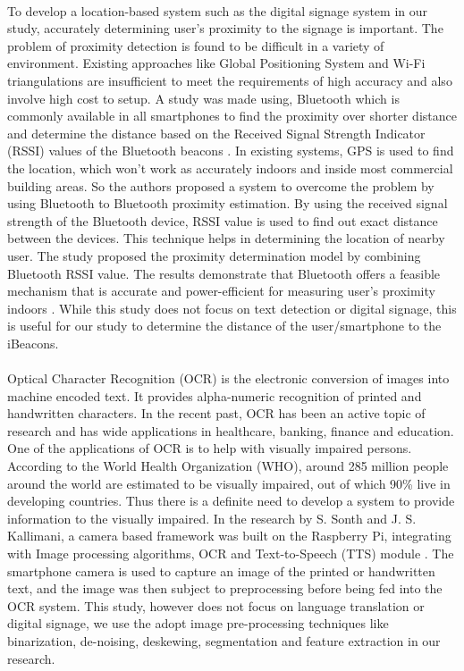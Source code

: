 \documentclass[12pt]{article}
\begin{document}
\paragraph{} To develop a location-based system such as the digital signage system in our study, accurately determining user's proximity to the signage is important. The problem of proximity detection is found to be difficult in a variety of environment. Existing approaches like Global Positioning System and Wi-Fi triangulations are insufficient to meet the requirements of high accuracy and also involve high cost to setup. A study was made using, Bluetooth which is commonly available in all smartphones to find the proximity over shorter distance and determine the distance based on the Received Signal Strength Indicator (RSSI) values of the Bluetooth  beacons \cite{distance}. In existing systems, GPS is used to find the location, which won't work as accurately indoors and inside most commercial building areas. So the authors proposed a system to overcome the problem by using Bluetooth to Bluetooth proximity estimation. By using the received signal strength of the Bluetooth device, RSSI value is used to find out exact distance between the devices. This technique helps in determining the location of nearby user. The study proposed the proximity determination model by combining Bluetooth RSSI value. The results demonstrate that Bluetooth offers a feasible mechanism that is accurate and power-efficient for measuring user's proximity indoors \cite{distance}. While this study does not focus on text detection or digital signage, this is  useful for our study to determine the distance of the user/smartphone to the iBeacons.

\paragraph{}Optical Character Recognition (OCR) is the electronic conversion of images into machine encoded text. It provides alpha-numeric recognition of printed and handwritten characters. In the recent past, OCR has been an active topic of research and has wide applications in healthcare, banking, finance and education. One of the applications of OCR is to help with visually impaired persons. According to the World Health Organization (WHO), around 285 million people around the world are estimated to be visually impaired, out of which 90\% live in developing countries. Thus there is a definite need to develop a system to provide information to the visually impaired. In the research by S. Sonth and J. S. Kallimani, a camera based framework was built on the Raspberry Pi, integrating with Image processing algorithms, OCR and Text-to-Speech (TTS) module \cite{ocr}. The smartphone camera is used to capture an image of the printed or handwritten text, and the image was then subject to preprocessing before being fed into the OCR system.\cite{ocr} This study, however does not focus on language translation or digital signage, we use the adopt image pre-processing techniques like binarization, de-noising, deskewing, segmentation and feature extraction in our research.
\end{document}
